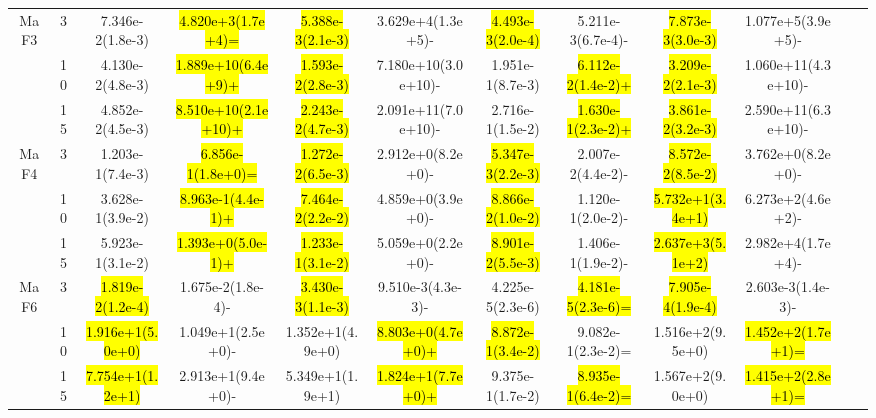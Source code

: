 \documentclass[a4paper,fleqn]{cas-dc}
\newcommand{\highlight}[1]{
	\begingroup
	\sethlcolor{Seashell}%
	\hl{#1}%
	\endgroup
}
\begin{document}
\begin{sloppypar}
\begin{table}[ht]
{\begin{tabular}{cccccccccccc}
				
				
				
				
				
				\multirow{3}{*}{MaF3}&3	&7.346e-2(1.8e-3)	&\highlight{4.820e+3(1.7e+4)=}	&\highlight{5.388e-3(2.1e-3)}	&3.629e+4(1.3e+5)-	&\highlight{4.493e-3(2.0e-4)}	&5.211e-3(6.7e-4)-	&\highlight{7.873e-3(3.0e-3)}	&1.077e+5(3.9e+5)-\\	
				\multirow{3}{*}{~}&10 &4.130e-2(4.8e-3)	&\highlight{1.889e+10(6.4e+9)+}	&\highlight{1.593e-2(2.8e-3)}	&7.180e+10(3.0e+10)-	&1.951e-1(8.7e-3)	&\highlight{6.112e-2(1.4e-2)+}	&\highlight{3.209e-2(2.1e-3)}	&1.060e+11(4.3e+10)-\\	
				\multirow{3}{*}{~}&15	&4.852e-2(4.5e-3)	&\highlight{8.510e+10(2.1e+10)+}	&\highlight{2.243e-2(4.7e-3)}	&2.091e+11(7.0e+10)-	&2.716e-1(1.5e-2)	&\highlight{1.630e-1(2.3e-2)+}	&\highlight{3.861e-2(3.2e-3)}	&2.590e+11(6.3e+10)-\\	
				\hline
				
				
				
				
				
				\multirow{3}{*}{MaF4}&3 	&1.203e-1(7.4e-3)	&\highlight{6.856e-1(1.8e+0)=}	&\highlight{1.272e-2(6.5e-3)}	&2.912e+0(8.2e+0)-	&\highlight{5.347e-3(2.2e-3)}	&2.007e-2(4.4e-2)-	&\highlight{8.572e-2(8.5e-2)}	&3.762e+0(8.2e+0)-\\	
				\multirow{3}{*}{~}&10 	&3.628e-1(3.9e-2)	&\highlight{8.963e-1(4.4e-1)+}	&\highlight{7.464e-2(2.2e-2)}	&4.859e+0(3.9e+0)-	&\highlight{8.866e-2(1.0e-2)}	&1.120e-1(2.0e-2)-	&\highlight{5.732e+1(3.4e+1)}	&6.273e+2(4.6e+2)-\\	
				\multirow{3}{*}{~}&15 	&5.923e-1(3.1e-2)	&\highlight{1.393e+0(5.0e-1)+}	&\highlight{1.233e-1(3.1e-2)}	&5.059e+0(2.2e+0)-	&\highlight{8.901e-2(5.5e-3)}	&1.406e-1(1.9e-2)-	&\highlight{2.637e+3(5.1e+2)}	&2.982e+4(1.7e+4)-\\	
				\hline
				
				
				
				
				
				
				
				
				
				\multirow{3}{*}{MaF6}&3 	&\highlight{1.819e-2(1.2e-4)}	&1.675e-2(1.8e-4)-	&\highlight{3.430e-3(1.1e-3)}	&9.510e-3(4.3e-3)-	&4.225e-5(2.3e-6)	&\highlight{4.181e-5(2.3e-6)=}	&\highlight{7.905e-4(1.9e-4)}	&2.603e-3(1.4e-3)-\\	
				\multirow{3}{*}{~}&10   &\highlight{1.916e+1(5.0e+0)}	&1.049e+1(2.5e+0)-	&1.352e+1(4.9e+0)	&\highlight{8.803e+0(4.7e+0)+}	&\highlight{8.872e-1(3.4e-2)}	&9.082e-1(2.3e-2)=	&1.516e+2(9.5e+0)	&\highlight{1.452e+2(1.7e+1)=}\\	
				\multirow{3}{*}{~}&15  	&\highlight{7.754e+1(1.2e+1)}	&2.913e+1(9.4e+0)-	&5.349e+1(1.9e+1)	&\highlight{1.824e+1(7.7e+0)+}	&9.375e-1(1.7e-2)	&\highlight{8.935e-1(6.4e-2)=}	&1.567e+2(9.0e+0)	&\highlight{1.415e+2(2.8e+1)=}\\	
				\hline
				

\end{tabular}}
\end{table}
\end{sloppypar}
\end{document}

